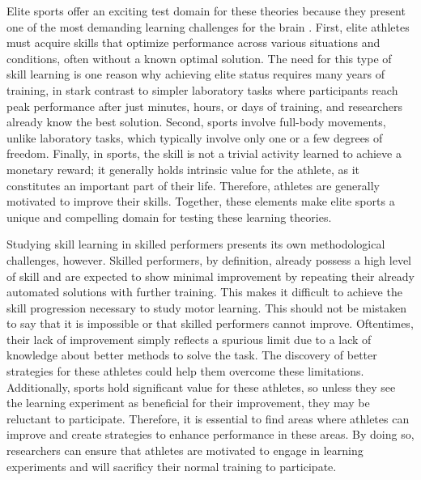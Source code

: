 Elite sports offer an exciting test domain for these theories because they present one of the most demanding learning challenges for the brain \cite{walsh_is_2014}. First, elite athletes must acquire skills that optimize performance across various situations and conditions\cite{mangalam_investigating_2023, du_relationship_2022, krakauer_motor_2019}, often without a known optimal solution. The need for this type of skill learning is one reason why achieving elite status requires many years of training, in stark contrast to simpler laboratory tasks where participants reach peak performance after just minutes, hours, or days of training, and researchers already know the best solution. Second, sports involve full-body movements, unlike laboratory tasks, which typically involve only one or a few degrees of freedom. Finally, in sports, the skill is not a trivial activity learned to achieve a monetary reward; it generally holds intrinsic value for the athlete, as it constitutes an important part of their life. Therefore, athletes are generally motivated to improve their skills. Together, these elements make elite sports a unique and compelling domain for testing these learning theories.

Studying skill learning in skilled performers presents its own methodological challenges, however. Skilled performers, by definition, already possess a high level of skill and are expected to show minimal improvement by repeating their already automated solutions with further training. This makes it difficult to achieve the skill progression necessary to study motor learning. This should not be mistaken to say that it is impossible or that skilled performers cannot improve. Oftentimes, their lack of improvement simply reflects a spurious limit due to a lack of knowledge about better methods to solve the task. The discovery of better strategies for these athletes could help them overcome these limitations. Additionally, sports hold significant value for these athletes, so unless they see the learning experiment as beneficial for their improvement, they may be reluctant to participate. Therefore, it is essential to find areas where athletes can improve and create strategies to enhance performance in these areas. By doing so, researchers can ensure that athletes are motivated to engage in learning experiments and will sacrificy their normal training to participate.

